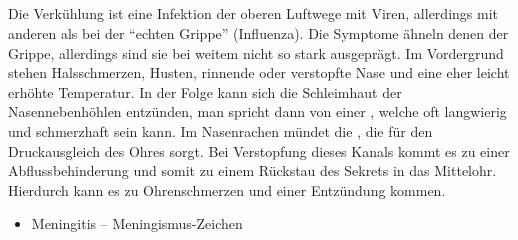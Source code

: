 % 
% 

\clearpage%

\subsection{}



\Text{\TxBeschreibung}
{%
Die Verkühlung ist eine Infektion der oberen Luftwege mit
Viren, allerdings mit anderen als bei der \enquote{echten Grippe}
(Influenza). Die Symptome ähneln denen der Grippe,
allerdings sind sie bei weitem nicht so stark ausgeprägt. Im
Vordergrund stehen Halsschmerzen, Husten, rinnende oder
verstopfte Nase und eine eher leicht erhöhte Temperatur.
%
In der Folge kann sich die Schleimhaut der Nasennebenhöhlen entzünden, 
man spricht dann von einer , 
welche oft langwierig und
schmerzhaft sein kann.
%
Im Nasenrachen mündet die 
, 
die für den Druckausgleich des Ohres sorgt. 
%
Bei Verstopfung dieses Kanals kommt es zu einer Abflussbehinderung 
und somit zu einem Rückstau des Sekrets in das Mittelohr.
% 
Hierdurch kann es zu Ohrenschmerzen und einer Entzündung kommen.
}{}{}{}{}

{
\begin{itemize}
  \item Meningitis -- Meningismus-Zeichen
\end{itemize}
}{}{}{}


